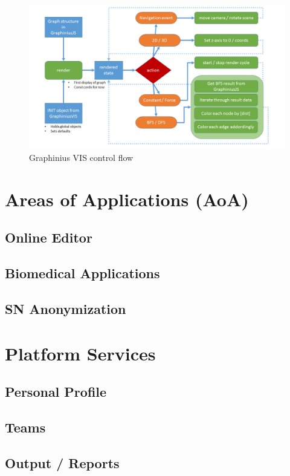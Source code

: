 	\begin{landscape}
		\begin{figure}[ht]
			\label{fig_vis_control_flow}
			\hspace*{-1cm}
			\includegraphics[width=1.9\textwidth]{figures/VIS_Control_Flow}
			\caption{Graphinius VIS control flow}
		\end{figure}
	\end{landscape}


\section{Areas of Applications (AoA)}
\label{sect:areas_of_applications}

	\subsection{Online Editor}
	\label{ssect:aoa_editor}
	
	\subsection{Biomedical Applications}
	\label{ssect:aoa_bioapps}
	
	\subsection{SN Anonymization}
	\label{ssect:aoa_anonym}


\section{Platform Services}
\label{sect:platform_services}

	\subsection{Personal Profile}
	\label{ssect:service_profile}
	
	\subsection{Teams}
	\label{ssect:service_teams}
	
	\subsection{Output / Reports}
	\label{ssect:service_output}